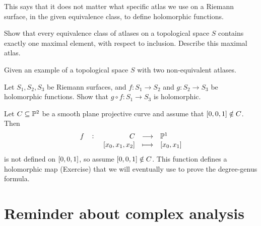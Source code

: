 This says that it does not matter what specific atlas we use on a Riemann surface, in the given equivalence class, to define holomorphic functions.

\begin{exercise}
Show that every equivalence class of atlases on a topological space $ S $ contains exactly one maximal element, with respect to inclusion. Describe this maximal atlas.
\end{exercise}

\begin{exercise}
Given an example of a topological space $ S $ with two non-equivalent atlases.
\end{exercise}

\begin{exercise}
Let $ S_1, S_2, S_3 $ be Riemann surfaces, and $ f : S_1 \to S_2 $ and $ g : S_2 \to S_3 $ be holomorphic functions. Show that $ g \circ f : S_1 \to S_3 $ is holomorphic.
\end{exercise}

\begin{example}
\label{eg:15.12}
Let $ C \subseteq \P^2 $ be a smooth plane projective curve and assume that $ \sbr{0, 0, 1} \notin C $. Then
$$ \function[f]{C}{\P^1}{\sbr{x_0, x_1, x_2}}{\sbr{x_0, x_1}} $$
is not defined on $ \sbr{0, 0, 1} $, so assume $ \sbr{0, 0, 1} \notin C $. This function defines a holomorphic map (Exercise) that we will eventually use to prove the degree-genus formula.
\end{example}

\pagebreak

\section{Reminder about complex analysis}

